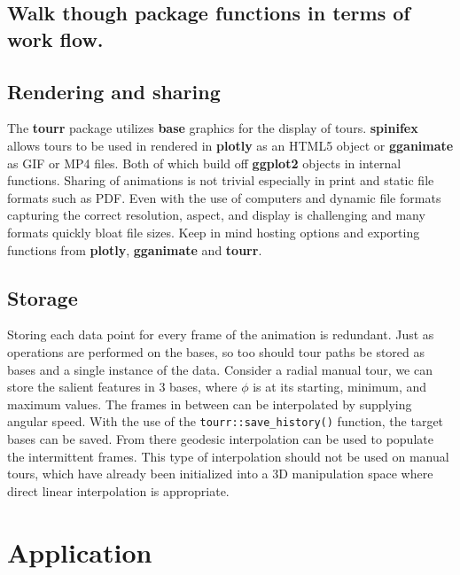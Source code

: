 \hypertarget{walk-though-package-functions-in-terms-of-work-flow.}{%
\subsection{Walk though package functions in terms of work
flow.}\label{walk-though-package-functions-in-terms-of-work-flow.}}

\hypertarget{rendering-and-sharing}{%
\subsection{Rendering and sharing}\label{rendering-and-sharing}}

The \textbf{tourr} package utilizes \textbf{base} graphics for the
display of tours. \textbf{spinifex} allows tours to be used in rendered
in \textbf{plotly} as an HTML5 object or \textbf{gganimate} as GIF or
MP4 files. Both of which build off \textbf{ggplot2} objects in internal
functions. Sharing of animations is not trivial especially in print and
static file formats such as PDF. Even with the use of computers and
dynamic file formats capturing the correct resolution, aspect, and
display is challenging and many formats quickly bloat file sizes. Keep
in mind hosting options and exporting functions from \textbf{plotly},
\textbf{gganimate} and \textbf{tourr}.

\hypertarget{storage}{%
\subsection{Storage}\label{storage}}

Storing each data point for every frame of the animation is redundant.
Just as operations are performed on the bases, so too should tour paths
be stored as bases and a single instance of the data. Consider a radial
manual tour, we can store the salient features in 3 bases, where
\(\phi\) is at its starting, minimum, and maximum values. The frames in
between can be interpolated by supplying angular speed. With the use of
the \texttt{tourr::save\_history()} function, the target bases can be
saved. From there geodesic interpolation can be used to populate the
intermittent frames. This type of interpolation should not be used on
manual tours, which have already been initialized into a 3D manipulation
space where direct linear interpolation is appropriate.

\hypertarget{sec:application}{%
\section{Application}\label{sec:application}}

